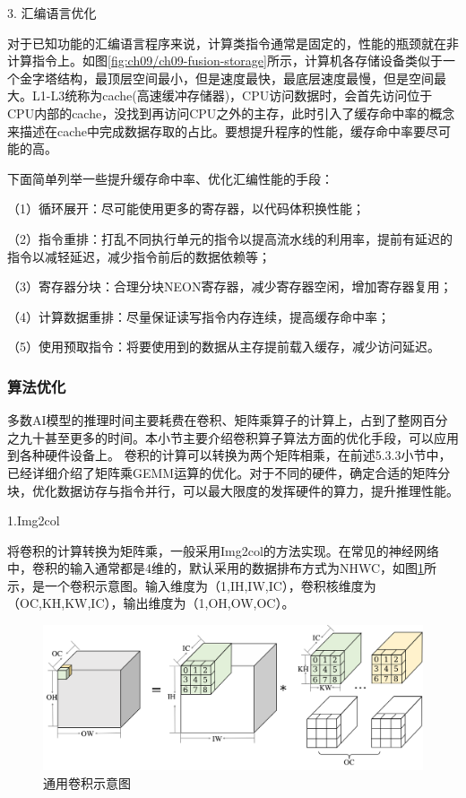 3. 汇编语言优化

对于已知功能的汇编语言程序来说，计算类指令通常是固定的，性能的瓶颈就在非计算指令上。如图\ref{fig:ch09/ch09-fusion-storage}所示，计算机各存储设备类似于一个金字塔结构，最顶层空间最小，但是速度最快，最底层速度最慢，但是空间最大。L1-L3统称为cache(高速缓冲存储器)，CPU访问数据时，会首先访问位于CPU内部的cache，没找到再访问CPU之外的主存，此时引入了缓存命中率的概念来描述在cache中完成数据存取的占比。要想提升程序的性能，缓存命中率要尽可能的高。

下面简单列举一些提升缓存命中率、优化汇编性能的手段：

（1）循环展开：尽可能使用更多的寄存器，以代码体积换性能；

（2）指令重排：打乱不同执行单元的指令以提高流水线的利用率，提前有延迟的指令以减轻延迟，减少指令前后的数据依赖等；

（3）寄存器分块：合理分块NEON寄存器，减少寄存器空闲，增加寄存器复用；

（4）计算数据重排：尽量保证读写指令内存连续，提高缓存命中率；

（5）使用预取指令：将要使用到的数据从主存提前载入缓存，减少访问延迟。
\subsubsection{算法优化}

多数AI模型的推理时间主要耗费在卷积、矩阵乘算子的计算上，占到了整网百分之九十甚至更多的时间。本小节主要介绍卷积算子算法方面的优化手段，可以应用到各种硬件设备上。
卷积的计算可以转换为两个矩阵相乘，在前述5.3.3小节中，已经详细介绍了矩阵乘GEMM运算的优化。对于不同的硬件，确定合适的矩阵分块，优化数据访存与指令并行，可以最大限度的发挥硬件的算力，提升推理性能。

1.Img2col

将卷积的计算转换为矩阵乘，一般采用Img2col的方法实现。在常见的神经网络中，卷积的输入通常都是4维的，默认采用的数据排布方式为NHWC，如图\ref{fig:ch09/ch09-conv_nhwc}所示，是一个卷积示意图。输入维度为（1,IH,IW,IC），卷积核维度为（OC,KH,KW,IC），输出维度为（1,OH,OW,OC）。

\begin{figure}[h]
\centering
\includegraphics[scale=0.5]{figs/ch09/ch09-conv_nhwc.png}
\caption{通用卷积示意图}
\label{fig:ch09/ch09-conv_nhwc}
\end{figure}

